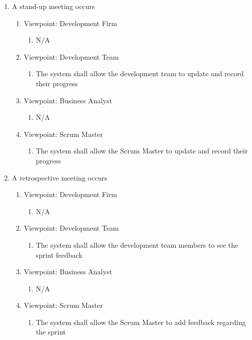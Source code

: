\documentclass[12pt, titlepage]{article}
\begin{document}
\begin{enumerate}[{BE}1.]
    \item A stand-up meeting occurs     %
    \begin{enumerate}[{VP}1.] 
        \item Viewpoint: Development Firm
            \begin{enumerate}
                \item[] N/A
            \end{enumerate}
        \item Viewpoint: Development Team
            \begin{enumerate}
                \item The system shall allow the development team to update and record their progress
            \end{enumerate}
        \item Viewpoint: Business Analyst
            \begin{enumerate}
                \item[] N/A
            \end{enumerate}
        \item Viewpoint: Scrum Master
            \begin{enumerate}
                \item The system shall allow the Scrum Master to update and record their progress
            \end{enumerate}
    \end{enumerate}

    \item A retrospective meeting occurs     %
    \begin{enumerate}[{VP}1.] 
        \item Viewpoint: Development Firm
            \begin{enumerate}
                \item[] N/A
            \end{enumerate}
        \item Viewpoint: Development Team
            \begin{enumerate}
                \item The system shall allow the development team members to see the sprint feedback
            \end{enumerate}
        \item Viewpoint: Business Analyst
            \begin{enumerate}
                \item[] N/A
            \end{enumerate}
        \item Viewpoint: Scrum Master
            \begin{enumerate}
                \item The system shall allow the Scrum Master to add feedback regarding the sprint
            \end{enumerate}
    \end{enumerate}
    

\end{enumerate}
\end{document}
